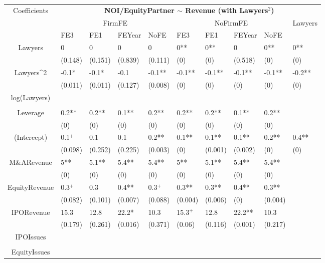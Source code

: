 \documentclass{article}
\begin{document}
\begin{table}[H]
\centering
\begin{tabular}{|clllllllll|}
\hline
\multirow{3}{*}{Coefficients} & \multicolumn{9}{c|}{\textbf{NOI/EquityPartner $\sim$ Revenue (with Lawyers$^2$)}} \\
\cline{2-10}
& \multicolumn{4}{c}{FirmFE} & \multicolumn{4}{c}{NoFirmFE} & \multirow{2}{*}{Lawyers} \\
\cline{2-9}
& FE3 & FE1 & FEYear & NoFE & FE3 & FE1 & FEYear & NoFE &  \\
\hline
 
Lawyers & 0 & 0 & 0 & 0 & 0** & 0** & 0 & 0** & 0** \\ 
   & (0.148) & (0.151) & (0.839) & (0.111) & (0) & (0) & (0.518) & (0) & (0) \\ 
  Lawyers^2 & -0.1* & -0.1* & -0.1 & -0.1** & -0.1** & -0.1** & -0.1** & -0.1** & -0.2** \\ 
   & (0.011) & (0.011) & (0.127) & (0.008) & (0) & (0) & (0) & (0) & (0) \\ 
  log(Lawyers) &  &  &  &  &  &  &  &  &  \\ 
   &  &  &  &  &  &  &  &  &  \\ 
  Leverage & 0.2** & 0.2** & 0.1** & 0.2** & 0.2** & 0.2** & 0.1** & 0.2** &  \\ 
   & (0) & (0) & (0) & (0) & (0) & (0) & (0) & (0) &  \\ 
  (Intercept) & 0.1$^{+}$ & 0.1 & 0.1 & 0.2** & 0.1** & 0.1** & 0.1** & 0.2** & 0.4** \\ 
   & (0.098) & (0.252) & (0.225) & (0.003) & (0) & (0.001) & (0.002) & (0) & (0) \\ 
  M\&ARevenue & 5** & 5.1** & 5.4** & 5.4** & 5** & 5.1** & 5.4** & 5.4** &  \\ 
   & (0) & (0) & (0) & (0) & (0) & (0) & (0) & (0) &  \\ 
  EquityRevenue & 0.3$^{+}$ & 0.3 & 0.4** & 0.3$^{+}$ & 0.3** & 0.3** & 0.4** & 0.3** &  \\ 
   & (0.082) & (0.101) & (0.007) & (0.088) & (0.004) & (0.006) & (0) & (0.004) &  \\ 
  IPORevenue & 15.3 & 12.8 & 22.2* & 10.3 & 15.3$^{+}$ & 12.8 & 22.2** & 10.3 &  \\ 
   & (0.179) & (0.261) & (0.016) & (0.371) & (0.06) & (0.116) & (0.001) & (0.217) &  \\ 
  IPOIssues &  &  &  &  &  &  &  &  &  \\ 
   &  &  &  &  &  &  &  &  &  \\ 
  EquityIssues &  &  &  &  &  &  &  &  &  \\ 

\end{tabular}
\end{table}
\end{document}
